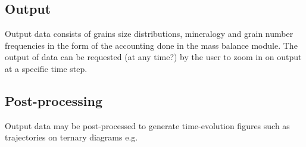    \subsection{Output}
    Output data consists of grains size distributions, mineralogy and grain number frequencies in the form of the accounting done in the mass balance module. %
    The output of data can be requested (at any time?) by the user to zoom in on output at a specific time step. %

    \subsection{Post-processing}
    Output data may be post-processed to generate time-evolution figures such as trajectories on ternary diagrams e.g. %








\cleardoublepage

